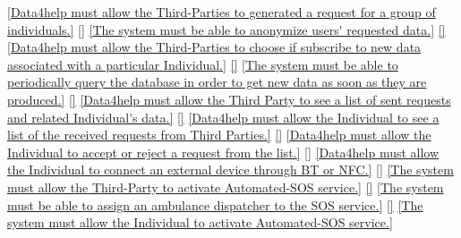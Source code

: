 \documentclass[a4paper]{article}
\begin{document}
\begin{traceabilitymatrix}
                {\ref{Data4help must allow the Third-Parties to generated a request for a group of individuals.}}
                {\ref{}}
                {}
            \con{\ref{The Third-Party should be able to make group requests.}}
                {\ref{The system must be able to anonymize users' requested data.}}
                {\ref{}}
                {}
            \con{\ref{The Third-Party should be able to subscribe to new data, once an Individual request is made.}}
                {\ref{Data4help must allow the Third-Parties to choose if subscribe to new data associated with a particular Individual.}}
                {\ref{}}
                {}
            \con{\ref{The Third-Party should be able to subscribe to new data, once an Individual request is made.}}
                {\ref{The system must be able to periodically query the database in order to get new data as soon as they are produced.}}
                {\ref{}}
                {}
            \con{\ref{The Third Party should be able to view Individual's data to whom has sent a request.}}
                {\ref{Data4help must allow the Third Party to see a list of sent requests and related Individual's data.}}
                {\ref{}}
                {}
            \con{\ref{The Individual should be able to accept or reject a request coming from a Third-Party.}}
                {\ref{Data4help must allow the Individual to see a list of the received requests from Third Parties.}}
                {\ref{}}
                {}
            \con{\ref{The Individual should be able to accept or reject a request coming from a Third-Party.}}
                {\ref{Data4help must allow the Individual to accept or reject a request from the list.}}
                {\ref{}}
                {}
            \con{\ref{The Individual shall be able connect an external device to the system.}}
                {\ref{Data4help must allow the Individual to connect an external device through BT or NFC.}}
                {\ref{}}
                {}
            \con{\ref{The Third-Party shall be able to activate Automated-SOS service.}}
                {\ref{The system must allow the Third-Party to activate Automated-SOS service.}}
                {\ref{}}
                {}
            \con{\ref{The Third-Party shall be able to activate Automated-SOS service.}}
                {\ref{The system must be able to assign an ambulance dispatcher to the SOS service.}}
                {\ref{}}
                {}
            \con{\ref{The Individual shall be able to activate Automated-SOS service.}}
                {\ref{The system must allow the Individual to activate Automated-SOS service.}}

\end{traceabilitymatrix}
\end{document}
